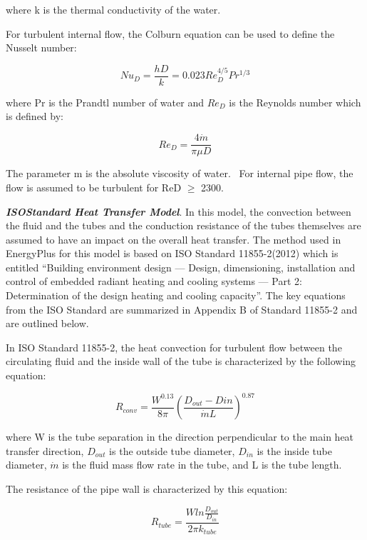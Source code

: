 where k is the thermal conductivity of the water.

For turbulent internal flow, the Colburn equation can be used to define the Nusselt number:

\begin{equation}
N{u_D} = \frac{{hD}}{k} = 0.023{Re_D^{4/5}}{Pr^{1/3}}
\end{equation}

where Pr is the Prandtl number of water and \(Re_D\) is the Reynolds number which is defined by:

\begin{equation}
{Re_D} = \frac{{4\dot m}}{{\pi \mu D}}
\label{eq:RadSysHXReD681}
\end{equation}

The parameter m is the absolute viscosity of water.~ For internal pipe flow, the flow is assumed to be turbulent for ReD \(\geq\) 2300.

\textbf{\emph{ISOStandard Heat Transfer Model}}.  In this model, the convection between the fluid and the tubes and the conduction resistance of the tubes themselves are assumed to have an impact on the overall heat transfer.  The method used in EnergyPlus for this model is based on ISO Standard 11855-2(2012) which is entitled ``Building environment design — Design, dimensioning, installation and control of embedded radiant heating and cooling systems — Part 2: Determination of the design heating and cooling capacity''.  The key equations from the ISO Standard are summarized in Appendix B of Standard 11855-2 and are outlined below.

In ISO Standard 11855-2, the heat convection for turbulent flow between the circulating fluid and the inside wall of the tube is characterized by the following equation:

\begin{equation}
{R_{conv}} = \frac{W^{0.13}}{8 \pi} {\left(\frac{D_{out}-D{in}}{\dot m L}\right)}^{0.87}
\end{equation}

where W is the tube separation in the direction perpendicular to the main heat transfer direction, \({D_{out}}\) is the outside tube diameter,  \({D_{in}}\) is the inside tube diameter,  \(\dot m\) is the fluid mass flow rate in the tube, and L is the tube length.

The resistance of the pipe wall is characterized by this equation:

\begin{equation}
{R_{tube}} = \frac{W ln\frac{D_{out}}{D_{in}}}{2 \pi k_{tube}}
\end{equation}

